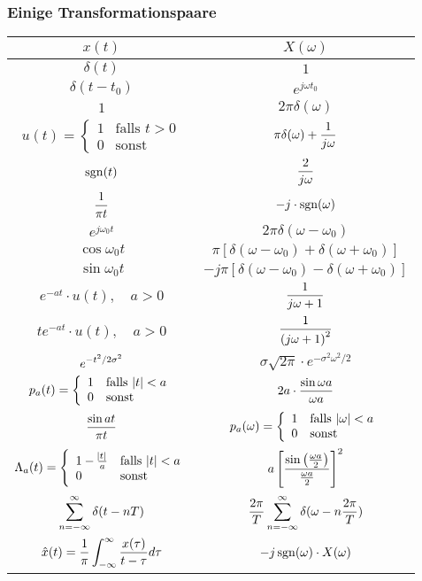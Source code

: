 \documentclass[a4paper]{article}
\begin{document}
\begin{twocolumn}
\subsubsection{Einige Transformationspaare}

\begin{tabular}{cc}
  $x(t)$ & $X(\omega)$ \\
  \toprule 
  $\delta(t)$ & $1$ \\
  $\delta(t-t_0)$ & $e^{j \omega t_0}$ \\
  $1$ & $2 \pi \delta(\omega)$ \\
  $u(t) = \left\{ \begin{array}{ll} 1 & \text{falls } t > 0 \\ 0 & \text{sonst} \end{array} \right.$ & $\displaystyle \pi \delta(\omega) + \frac{1}{j\omega}$ \\
  $\operatorname{sgn}(t)$ & $\displaystyle \frac{2}{j\omega}$ \\
  $\displaystyle \frac{1}{\pi t}$ & $-j \cdot \operatorname{sgn}(\omega)$ \\
  $e^{j \omega_0 t}$ & $2 \pi \delta(\omega - \omega_0)$ \\
  $\cos \omega_0 t$ & $\pi \left[ \delta(\omega - \omega_0) + \delta(\omega + \omega_0) \right]$ \\
  $\sin \omega_0 t$ & $-j \pi \left[ \delta(\omega - \omega_0) - \delta(\omega + \omega_0) \right]$ \\
  $e^{-a t} \cdot u(t), \quad a > 0$ & $\displaystyle \frac{1}{j \omega + 1}$ \\
  $t e^{-a t} \cdot u(t), \quad a > 0$ & $\displaystyle \frac{1}{\left( j \omega + 1 \right)^2}$ \\
  $\displaystyle e^{-t^2 / 2\sigma^2 }$ & $\sigma \sqrt{2\pi} \cdot e^{-\sigma^2 \omega^2 / 2}$ \\
  $p_a(t) = \left\{ \begin{array}{ll} 1 & \text{falls } \abs{t} < a \\ 0 & \text{sonst} \end{array} \right.$ & $\displaystyle 2a \cdot \frac{\sin \omega a}{\omega a}$ \\
  $\displaystyle \frac{\sin at}{\pi t}$ & $p_a(\omega) = \left\{ \begin{array}{ll} 1 & \text{falls } \abs{\omega} < a \\ 0 & \text{sonst} \end{array} \right.$ \\
  $\Lambda_a(t) = \left\{ \begin{array}{ll} 1 - \frac{\abs{t}}{a} & \text{falls } \abs{t} < a \\ 0 & \text{sonst} \end{array} \right.$ & $\displaystyle a \left[ \frac{\sin \left(\frac{\omega a}{2}\right)}{\frac{\omega a}{2}} \right]^2$ \\
  $\displaystyle \sum_{n = -\infty}^{\infty} \delta(t - nT)$ & $\displaystyle \frac{2\pi}{T} \sum_{n = -\infty}^{\infty} \delta(\omega - n \frac{2\pi}{T})$ \\
  $\displaystyle \hat{x}(t) = \frac{1}{\pi} \int_{-\infty}^\infty \frac{x(\tau)}{t - \tau}d \tau$ & $-j \operatorname{sgn}(\omega) \cdot X(\omega)$ \\
\end{tabular}


\end{twocolumn}
\end{document}
